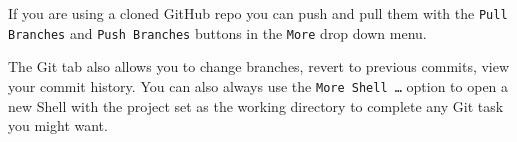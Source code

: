 If you are using a cloned GitHub repo you can push and pull them with the \texttt{Pull Branches} and \texttt{Push Branches} buttons in the \texttt{More} drop down menu.

The Git tab also allows you to change branches, revert to previous commits, view your commit history. You can also always use the \texttt{More \textrightarrow\:Shell \ldots} option to open a new Shell with the project set as the working directory to complete any Git task you might want.

